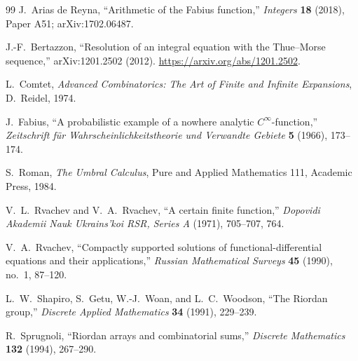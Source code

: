 \documentclass[11pt,a4paper,oneside,openany]{book}
\numberwithin{equation}{chapter}
\theoremstyle{definition}
\theoremstyle{remark}
\begin{document}
\begin{thebibliography}{99}
J.~Arias de Reyna, ``Arithmetic of the Fabius function,'' \emph{Integers}
\textbf{18} (2018), Paper A51; arXiv:1702.06487.

J.-F.~Bertazzon, ``Resolution of an integral equation with the Thue--Morse
sequence,'' arXiv:1201.2502 (2012).
\url{https://arxiv.org/abs/1201.2502}.

L.~Comtet, \emph{Advanced Combinatorics: The Art of Finite and Infinite
Expansions}, D.~Reidel, 1974.

J.~Fabius, ``A probabilistic example of a nowhere analytic
$C^\infty$-function,'' \emph{Zeitschrift f\"ur Wahrscheinlichkeitstheorie
und Verwandte Gebiete} \textbf{5} (1966), 173--174.

S.~Roman, \emph{The Umbral Calculus}, Pure and Applied Mathematics 111,
Academic Press, 1984.

V.~L.~Rvachev and V.~A.~Rvachev, ``A certain finite function,''
\emph{Dopovidi Akademii Nauk Ukrains'koi RSR, Series A} (1971), 705--707,
764.

V.~A.~Rvachev, ``Compactly supported solutions of functional-differential
equations and their applications,'' \emph{Russian Mathematical Surveys}
\textbf{45} (1990), no.~1, 87--120.

L.~W.~Shapiro, S.~Getu, W.-J.~Woan, and L.~C.~Woodson, ``The Riordan
group,'' \emph{Discrete Applied Mathematics} \textbf{34} (1991), 229--239.

R.~Sprugnoli, ``Riordan arrays and combinatorial sums,'' \emph{Discrete
Mathematics} \textbf{132} (1994), 267--290.

\end{thebibliography}
\end{document}
